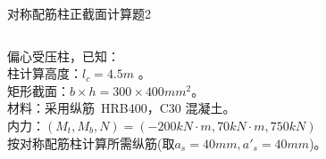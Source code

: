 \begin{frame}[plain]{ 对称配筋柱正截面计算题2 }
\begin{columns}[onlytextwidth]
\begin{column}{0.75\textwidth}
偏心受压柱，已知：\\
柱计算高度：$l_c= 4.5 m$ 。 \\
矩形截面：$b \times h = 300 \times 400 mm^2$。\\
材料：采用纵筋~HRB400，C30 混凝土。\\
内力：$(M_t, M_b, N) = ( -200 kN\cdot m, 70 kN\cdot m, 750 kN)$ \\
按对称配筋柱计算所需纵筋(取$a_s = 40 mm, a'_s = 40 mm$)。\\
\end{column}

\begin{column}{0.25\textwidth}
\begin{center}
\end{center}
\end{column}

\end{columns}
\end{frame}

